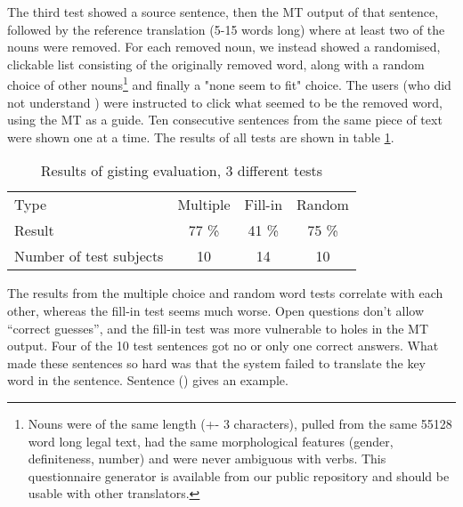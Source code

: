\documentclass{book}
\begin{document}
The third test showed a \sme{} source sentence, then the MT output of
that sentence, followed by the reference translation (5-15 words long)
where at least two of the nouns were removed. For each removed noun,
we instead showed a randomised, clickable list consisting of the
originally removed word, along with a random choice of other
nouns\footnote{Nouns were of the same length (+- 3 characters), pulled
  from the same 55128 word long legal text, had the same morphological
  features (gender, definiteness, number) and were never ambiguous
  with verbs. This questionnaire generator is available from our
  public repository and should be usable with other translators.} and
finally a "none seem to fit" choice. The users (who did not understand
\sme{}) were instructed to click what seemed to be the removed word,
using the MT as a guide. Ten consecutive sentences from the same piece
of text were shown one at a time. The results of all tests are shown
in table \ref{eval}.

\begin{table}[htdp]
\caption{Results of gisting evaluation, 3 different tests}
\begin{center}
\begin{tabular}{lccc}
Type & Multiple & Fill-in & Random \\
Result & 77 \% & 41 \% & 75 \% \\
Number of test subjects & 10 & 14  & 10  \\
\end{tabular}
\end{center}
\label{eval}
\end{table}%



The results from the multiple choice and random word tests correlate
with each other, whereas the fill-in test seems much worse. Open
questions don't allow ``correct guesses'', and the fill-in test was
more vulnerable to holes in the MT output. Four of the 10 test
sentences got no or only one correct answers. What made these
sentences so hard was that the system failed to translate the key word
in the sentence. Sentence () gives an example.

\end{document}
